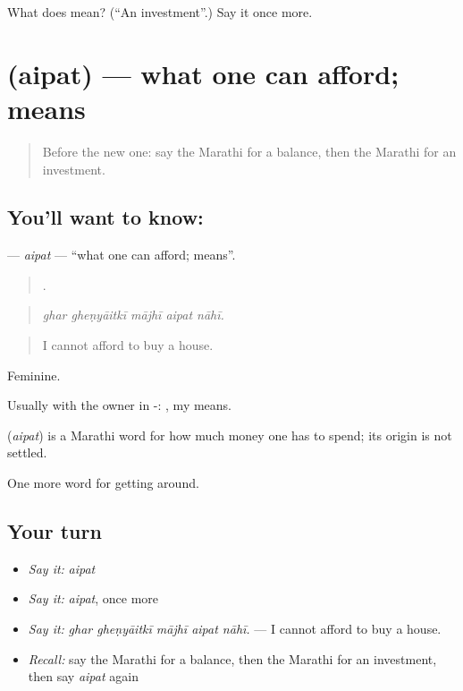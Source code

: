 \begin{tcolorbox}[breakable,colback=teal!4,colframe=teal!35!black,title={Before you move on}]
What does  mean? (\textquotedblleft{}An investment\textquotedblright{}.) Say it once more.
\end{tcolorbox}
\section[\texorpdfstring{\mr{ऐपत} (aipat)}{ऐपत (aipat)}]{ (aipat) — what one can afford; means}

\label{lesson:MR-C428-aipat}



\begin{quote}
Before the new one: say the Marathi for a balance, then the Marathi for an investment.
\end{quote}

\subsection*{You'll want to know: }
\textbf{} — \emph{aipat} — \textquotedblleft{}what one can afford; means\textquotedblright{}.

\begin{quote}
    .
\end{quote}

\begin{quote}
\emph{ghar gheṇyāitkī mājhī aipat nāhī.}
\end{quote}

\begin{quote}
I cannot afford to buy a house.
\end{quote}

Feminine.

Usually with the owner in -:  , my means.

\begin{cousinweb}
\textbf{} (\emph{aipat}) is a Marathi word for how much money one has to spend; its origin is not settled.
\end{cousinweb}

\begin{grammarlens}[title={What you've built}]
One more word for getting around.
\end{grammarlens}

\subsection*{Your turn}
\begin{itemize}
\raggedright
  \item \emph{Say it:} \emph{aipat}
  \item \emph{Say it:} \emph{aipat}, once more
  \item \emph{Say it:} \emph{ghar gheṇyāitkī mājhī aipat nāhī.} — I cannot afford to buy a house.
  \item \emph{Recall:} say the Marathi for a balance, then the Marathi for an investment, then say \emph{aipat} again
\end{itemize}

